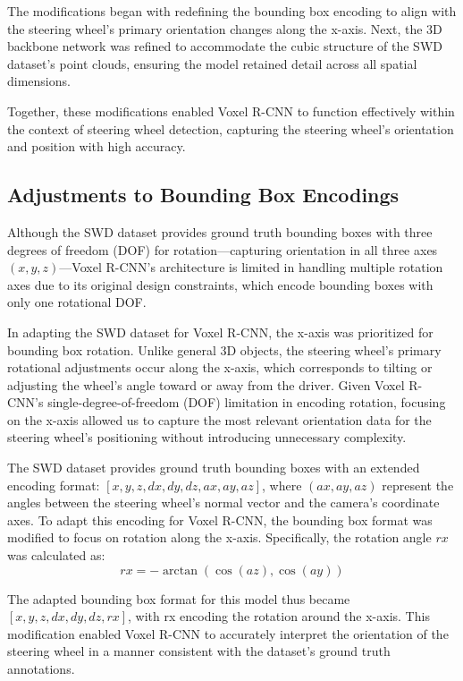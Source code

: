The modifications began with redefining the bounding box encoding to align with the steering wheel’s primary orientation changes along the x-axis. Next, the 3D backbone network was refined to accommodate the cubic structure of the SWD dataset’s point clouds, ensuring the model retained detail across all spatial dimensions.

Together, these modifications enabled Voxel R-CNN to function effectively within the context of steering wheel detection, capturing the steering wheel’s orientation and position with high accuracy.

\subsection{Adjustments to Bounding Box Encodings}
Although the SWD dataset provides ground truth bounding boxes with three degrees of freedom (DOF) for rotation—capturing orientation in all three axes \((x, y, z)\)—Voxel R-CNN’s architecture is limited in handling multiple rotation axes due to its original design constraints, which encode bounding boxes with only one rotational DOF.



In adapting the SWD dataset for Voxel R-CNN, the x-axis was prioritized for bounding box rotation. Unlike general 3D objects, the steering wheel’s primary rotational adjustments occur along the x-axis, which corresponds to tilting or adjusting the wheel’s angle toward or away from the driver. Given Voxel R-CNN’s single-degree-of-freedom (DOF) limitation in encoding rotation, focusing on the x-axis allowed us to capture the most relevant orientation data for the steering wheel’s positioning without introducing unnecessary complexity. 



The SWD dataset provides ground truth bounding boxes with an extended encoding format: \([x, y, z, dx, dy, dz, ax, ay, az]\), where \((ax, ay, az)\) represent the angles between the steering wheel’s normal vector and the camera’s coordinate axes.
To adapt this encoding for Voxel R-CNN, the bounding box format was modified to focus on rotation along the x-axis. Specifically, the rotation angle \(rx\) was calculated as:
\[
rx = -\arctan\left(\cos(az), \cos(ay)\right)
\]


The adapted bounding box format for this model thus became \([x, y, z, dx, dy, dz, rx]\), with rx encoding the rotation around the x-axis. This modification enabled Voxel R-CNN to accurately interpret the orientation of the steering wheel in a manner consistent with the dataset’s ground truth annotations.


